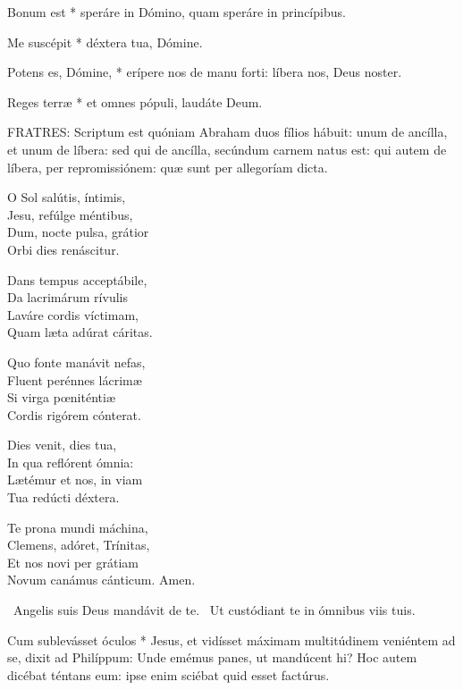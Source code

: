  Bonum est * speráre in Dómino, quam speráre in princípibus.

 Me suscépit * déxtera tua, Dómine.

 Potens es, Dómine, * erípere nos de manu forti: líbera nos, Deus noster.

 Reges terræ * et omnes pópuli, laudáte Deum.


\lettrine[lines=2]{F}{RATRES}: Scriptum est quóniam Abraham duos fílios hábuit: unum de ancílla, et unum de líbera: sed qui de ancílla, secúndum carnem natus est: qui autem de líbera, per repromissiónem: quæ sunt per allegoríam dicta.


\lettrine[lines=2]{O}{} Sol salútis, íntimis,\\
Jesu, refúlge méntibus,\\
Dum, nocte pulsa, grátior\\
Orbi dies renáscitur.

Dans tempus acceptábile,\\
Da lacrimárum rívulis\\
Laváre cordis víctimam,\\
Quam læta adúrat cáritas.

Quo fonte manávit nefas,\\
Fluent perénnes lácrimæ\\
Si virga pœniténtiæ\\
Cordis rigórem cónterat.

Dies venit, dies tua,\\
In qua reflórent ómnia:\\
Lætémur et nos, in viam\\
Tua redúcti déxtera.


Te prona mundi máchina,\\
Clemens, adóret, Trínitas,\\
Et nos novi per grátiam\\
Novum canámus cánticum. Amen.

\V\ Angelis suis Deus mandávit de te. \R\ Ut custódiant te in ómnibus viis tuis.

 Cum sublevásset óculos * Jesus, et vidísset máximam multitúdinem veniéntem ad se, dixit ad Philíppum: Unde emémus panes, ut mandúcent hi? Hoc autem dicébat téntans eum: ipse enim sciébat quid esset factúrus.

